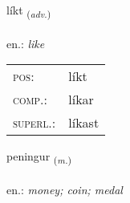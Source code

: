 \documentclass[frontgrid, backgrid]{flacards}\usepackage[]{graphicx}\usepackage[]{xcolor}
\begin{document}
\renewcommand{\flhead}{\vskip5pt \fboxsep=0pt {\small\bfseries\footnotesize Atviksorð | Adverb}}
\renewcommand{\fcfoot}{\vskip5pt \fboxsep=0pt \hspace{2pt}{\small\bfseries\footnotesize 1K}}

\renewcommand{\blhead}{\vskip5pt {\small\bfseries\footnotesize Atviksorð | Adverb }}
\renewcommand{\bcfoot}{\vskip5pt \hspace{2pt}{\small\bfseries\footnotesize 1K}}


{líkt \small{\textsubscript{(\textit{adv.})}} \\[1ex] %
\textphonetic{[lixt]} \\
en.: \emph{like} \\  [2ex]
\renewcommand*{\arraystretch}{0.8}
\begin{tabular}{ll}
\textsc{pos}: & líkt \\ 
\textsc{comp.}: & líkar \\ 
\textsc{superl.}: & líkast \\
\end{tabular}
}

\renewcommand{\flhead}{\vskip5pt \fboxsep=0pt {\small\bfseries\footnotesize Nafnorð | Noun}}
\renewcommand{\fcfoot}{\vskip5pt \fboxsep=0pt \hspace{2pt}{\small\bfseries\footnotesize 1K}}

\renewcommand{\blhead}{\vskip5pt {\small\bfseries\footnotesize Nafnorð | Noun }}
\renewcommand{\bcfoot}{\vskip5pt \hspace{2pt}{\small\bfseries\footnotesize 1K}}


{peningur \small{\textsubscript{(\textit{m.})}} \\[1ex] %
\textphonetic{[pʰɛːniŋkʏr]} \\
en.: \emph{money; coin; medal} \\  [2ex]
\renewcommand*{\arraystretch}{0.8}
}
\end{document}
